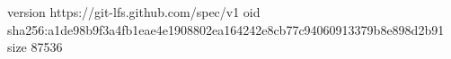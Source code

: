 version https://git-lfs.github.com/spec/v1
oid sha256:a1de98b9f3a4fb1eae4e1908802ea164242e8cb77c94060913379b8e898d2b91
size 87536
